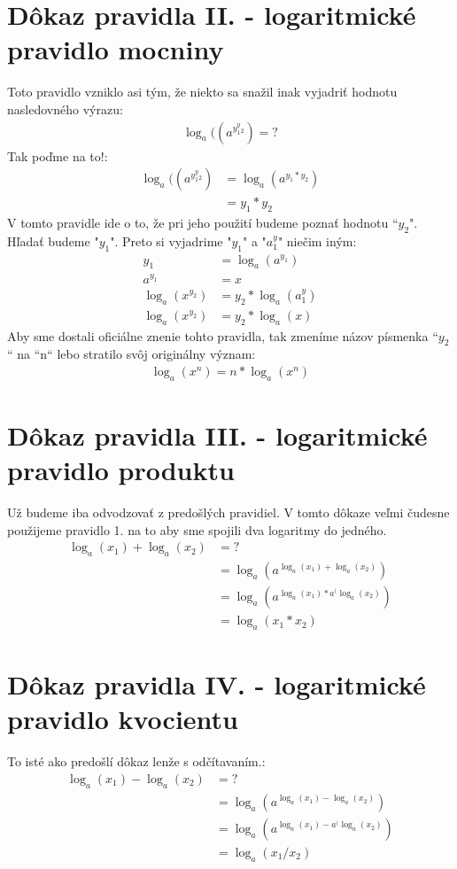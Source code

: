 \documentclass{article}
\begin{document}
\section*{Dôkaz pravidla II. - logaritmické pravidlo mocniny}
Toto pravidlo vzniklo asi tým, že niekto sa snažil inak vyjadriť hodnotu nasledovného výrazu: \\
\begin{align}
	\log_a((a^{y_1^y_2}) = ?
\end{align}
Tak poďme na to!: \\
\begin{align}
	\log_a((a^{y_1^y_2}) & = \log_a(a^{y_1 * y_2}) \\
	& = y_1 * y_2 \tag{použili sme I.}
\end{align}
V tomto pravidle ide o to, že pri jeho použití budeme poznať hodnotu ``$y_2$". Hľadať budeme "$y_1$". Preto si vyjadrime "$y_1$" a "$a^y_1$" niečim iným: \\
\begin{align}
	y_1 & = \log_a(a^{y_1}) \\
	a^{y_1} & = x \\
	\log_a(x^{y_2}) & = y_2 * \log_a(a^y_1) \\
	\log_a(x^{y_2}) & = y_2 * \log_a(x)
\end{align}
Aby sme dostali oficiálne znenie tohto pravidla, tak zmeníme názov písmenka ``$y_2$`` na ``n`` lebo stratilo svôj originálny význam: \\
\begin{align}
	\log_a(x^n) = n * \log_a(x^n)
\end{align}


\section*{Dôkaz pravidla III. - logaritmické pravidlo produktu}
Už budeme iba odvodzovať z predošlých pravidiel. V tomto dôkaze veľmi čudesne použijeme pravidlo 1. na to aby sme spojili dva logaritmy do jedného.\\
\begin{align}
\log_a(x_1) + \log_a(x_2) & = ? \\
	& = \log_a(a^{\log_a(x_1) + \log_a(x_2)})  \\
	& = \log_a(a^{\log_a(x_1) * a^(\log_a(x_2)}) \\
	& = \log_a(x_1 * x_2)
\end{align}

\section*{Dôkaz pravidla IV. - logaritmické pravidlo kvocientu}
To isté ako predošlí dôkaz lenže s odčítavaním.:
\begin{align} 
\log_a(x_1) - \log_a(x_2) & = ? \\
	& = \log_a(a^{\log_a(x_1) - \log_a(x_2)})  \\
	& = \log_a(a^{\log_a(x_1) - a^(\log_a(x_2)}) \\
	& = \log_a(x_1/x_2)
\end{align}
\end{document}
